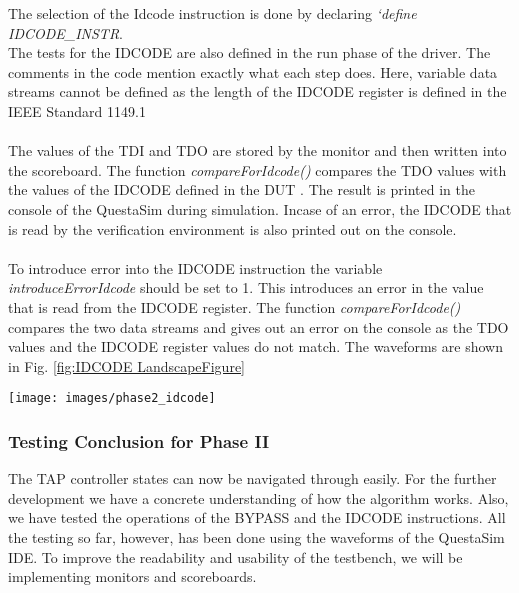 \documentclass[a4paper,11pt]{article}
\begin{document}
The selection of the Idcode instruction is done by declaring \textit{`define IDCODE\_INSTR}.\\
The tests for the IDCODE are also defined in the run phase of the driver. The comments in the code mention exactly what each step does. Here, variable data streams cannot be defined as the length of the IDCODE register is defined in the IEEE Standard 1149.1\\
 \\
The values of the TDI and TDO are stored by the monitor and then written into the scoreboard. The function \textit{compareForIdcode()} compares the TDO values with the values of the IDCODE defined in the DUT . The result is printed in the console of the QuestaSim during simulation. Incase of an error, the IDCODE that is read by the verification environment is also printed out on the console. \\
 \\
 To introduce error into the IDCODE instruction the variable \textit{introduceErrorIdcode} should be set to 1. This introduces an error in the value that is read from the IDCODE register. The function \textit{compareForIdcode()} compares the two data streams and gives out an error on the console as the TDO values and the IDCODE register values do not match. The waveforms are shown in Fig. \ref{fig:IDCODE LandscapeFigure}

\newpage
\pagebreak

\begin{sidewaysfigure}[ht]
\centering
\texttt{[image: images/phase2\_idcode]}
\caption{IDCODE testing\\a. 32 bit IDCODE is shifted out to the TDO. This can be verified from the waveform.\\b. The IDCODE of the DUT is h149511c3}
\label{fig:IDCODE LandscapeFigure}
\end{sidewaysfigure}

\FloatBarrier
\subsubsection{Testing Conclusion for Phase II}
The TAP controller states can now be navigated through easily. For the further development we have a concrete understanding of how the algorithm works. Also, we have tested the operations of the BYPASS and the IDCODE instructions. All the testing so far, however, has been done using the waveforms of the QuestaSim IDE. To improve the readability and usability of the testbench, we will be implementing monitors and scoreboards.
\end{document}
